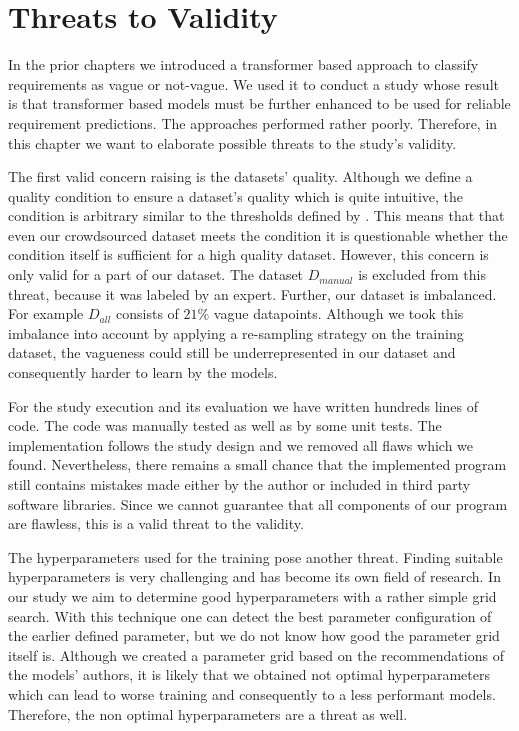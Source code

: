 \chapter{Threats to Validity}
\label{chp:threats_to_validity}
In the prior chapters we introduced a transformer based approach to classify requirements as vague or not-vague.
We used it to conduct a study whose result is that transformer based models must be further enhanced to be used for reliable requirement predictions.
The approaches performed rather poorly.
Therefore, in this chapter we want to elaborate possible threats to the study's validity.

The first valid concern raising is the datasets' quality.
Although we define a quality condition to ensure a dataset's quality which is quite intuitive, the condition is arbitrary similar to the thresholds defined by \textcite{Landis:1977}.
This means that that even our crowdsourced dataset meets the condition it is questionable whether the condition itself is sufficient for a high quality dataset.
However, this concern is only valid for a part of our dataset.
The dataset $D_{manual}$ is excluded from this threat, because it was labeled by an expert.
Further, our dataset is imbalanced.
For example $D_{all}$ consists of $21\%$ vague datapoints.
Although we took this imbalance into account by applying a re-sampling strategy on the training dataset, the vagueness could still be underrepresented in our dataset and consequently harder to learn by the models.

For the study execution and its evaluation we have written hundreds lines of code.
The code was manually tested as well as by some unit tests.
The implementation follows the study design and we removed all flaws which we found.
Nevertheless, there remains a small chance that the implemented program still contains mistakes made either by the author or included in third party software libraries.
Since we cannot guarantee that all components of our program are flawless, this is a valid threat to the validity.

The hyperparameters used for the training pose another threat.
Finding suitable hyperparameters is very challenging \parencite{Zeiler:2012} and has become its own field of research.
In our study we aim to determine good hyperparameters with a rather simple grid search.
With this technique one can detect the best parameter configuration of the earlier defined parameter, but we do not know how good the parameter grid itself is.
Although we created a parameter grid based on the recommendations of the models' authors, it is likely that we obtained not optimal hyperparameters which can lead to worse training and consequently to a less performant models.
Therefore, the non optimal hyperparameters are a threat as well.

